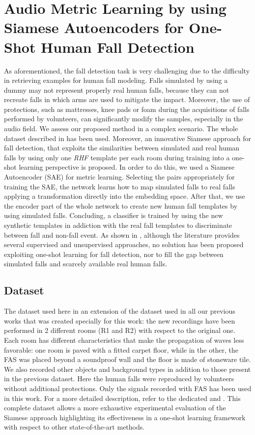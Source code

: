 \section{Audio Metric Learning by using Siamese Autoencoders for One-Shot Human Fall Detection}
\label{sec:siamese_one_shot}

As aforementioned, the fall detection task is very challenging due to the difficulty in retrieving examples for human fall modeling. Falls simulated by using a dummy may not represent properly real human falls, because they can not recreate falls in which arms are used to mitigate the impact. Moreover, the use of protections, such as mattresses, knee pads or foam during the acquisitions of falls performed by volunteers, can significantly modify the samples, especially in the audio field. 
We assess our proposed method in a complex scenario. The whole dataset described in  has been used.
Moreover, an innovative Siamese approach for fall detection, that exploits the similarities between simulated and real human falls by using only one \textit{RHF} template per each room during training into a one-shot learning perspective is proposed.
In order to do this, we used a Siamese Autoencoder (SAE) for metric learning. Selecting the pairs appropriately for training the SAE, the network learns how to map simulated falls to real falls applying a transformation directly into the embedding space. After that, we use the encoder part of the whole network to create new human fall templates by using simulated falls. Concluding, a classifier is trained by using the new synthetic templates in addiction with the real fall templates to discriminate between fall and non-fall event.
As shown in , although the literature provides several supervised and unsupervised approaches, no solution has been proposed exploiting one-shot learning for fall detection, nor to fill the gap between simulated falls and scarcely available real human falls.


\subsection{Dataset}
The dataset used here in an extension of the dataset used in all our previous works that was created specially for this work: the new recordings have been performed in 2 different rooms (R1 and R2) with respect to the original one. Each room has different characteristics that make the propagation of waves less favorable: one room is paved with a fitted carpet floor, while in the other, the FAS was placed beyond a soundproof wall and the floor is made of stoneware tile. We also recorded other objects and background types in addition to those present in the previous dataset. Here the human falls were reproduced by volunteers without additional protections. Only the signals recorded with FAS has been used in this work. For a more detailed description, refer to the dedicated  and .
This complete dataset allows a more exhaustive experimental evaluation of the Siamese approach highlighting its effectiveness in a one-shot learning framework with respect to other state-of-the-art methods.

